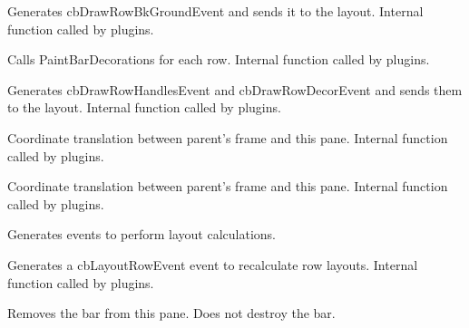 
Generates cbDrawRowBkGroundEvent and sends it to the layout.
Internal function called by plugins.


\label{cbdockpanepaintrowdecorations}


Calls PaintBarDecorations for each row.
Internal function called by plugins.


\label{cbdockpanepaintrowhandles}


Generates cbDrawRowHandlesEvent and cbDrawRowDecorEvent and sends them to the layout.
Internal function called by plugins.


\label{cbdockpanepanetoframe}


Coordinate translation between parent's frame and this pane.
Internal function called by plugins.



Coordinate translation between parent's frame and this pane.
Internal function called by plugins.


\label{cbdockpanerecalclayout}


Generates events to perform layout calculations.


\label{cbdockpanerecalcrowlayout}


Generates a cbLayoutRowEvent event to recalculate row layouts.
Internal function called by plugins.


\label{cbdockpaneremovebar}


Removes the bar from this pane. Does not destroy the bar.


\label{cbdockpaneremoverow}

